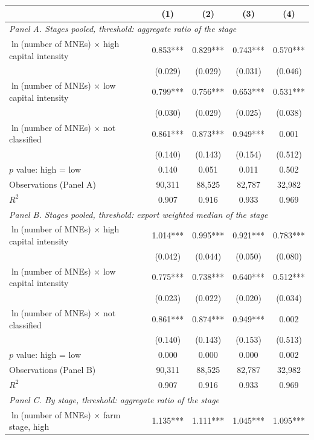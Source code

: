 \begin{tabular}{l*{4}{c}}
\toprule
 & (1) & (2) & (3) & (4) \\
\midrule
\multicolumn{5}{l}{\textit{Panel A. Stages pooled, threshold: aggregate ratio of the stage}} \\
$\ln$(number of MNEs) $\times$ high capital intensity & 0.853*** & 0.829*** & 0.743*** & 0.570*** \\
 & (0.029) & (0.029) & (0.031) & (0.046) \\
$\ln$(number of MNEs) $\times$ low capital intensity & 0.799*** & 0.756*** & 0.653*** & 0.531*** \\
 & (0.030) & (0.029) & (0.025) & (0.038) \\
$\ln$(number of MNEs) $\times$ not classified & 0.861*** & 0.873*** & 0.949*** & 0.001 \\
 & (0.140) & (0.143) & (0.154) & (0.512) \\
$p$ value: high = low & 0.140 & 0.051 & 0.011 & 0.502 \\
Observations (Panel A) & 90,311 & 88,525 & 82,787 & 32,982 \\
$R^2$ & 0.907 & 0.916 & 0.933 & 0.969 \\
\midrule
\multicolumn{5}{l}{\textit{Panel B. Stages pooled, threshold: export weighted median of the stage}} \\
$\ln$(number of MNEs) $\times$ high capital intensity & 1.014*** & 0.995*** & 0.921*** & 0.783*** \\
 & (0.042) & (0.044) & (0.050) & (0.080) \\
$\ln$(number of MNEs) $\times$ low capital intensity & 0.775*** & 0.738*** & 0.640*** & 0.512*** \\
 & (0.023) & (0.022) & (0.020) & (0.034) \\
$\ln$(number of MNEs) $\times$ not classified & 0.861*** & 0.874*** & 0.949*** & 0.002 \\
 & (0.140) & (0.143) & (0.153) & (0.513) \\
$p$ value: high = low & 0.000 & 0.000 & 0.000 & 0.002 \\
Observations (Panel B) & 90,311 & 88,525 & 82,787 & 32,982 \\
$R^2$ & 0.907 & 0.916 & 0.933 & 0.969 \\
\midrule
\multicolumn{5}{l}{\textit{Panel C. By stage, threshold: aggregate ratio of the stage}} \\
$\ln$(number of MNEs) $\times$ farm stage, high & 1.135*** & 1.111*** & 1.045*** & 1.095*** \\

\end{tabular}
